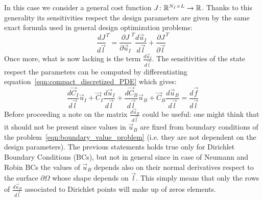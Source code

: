 In this case we consider a general cost function $J \colon \mathbb{R}^{N_I \times L} \to \mathbb{R}$. Thanks to this generality its sensitivities respect the design parameters are given by the same exact formula used in general design optimization problems:
\begin{equation}
	\label{eqn:gradient_1st_step_1D_RBF-FD}
	\frac{dJ}{d\vec{l}}^T = \frac{\partial J}{\partial \vec{u}_I}^T \frac{d\vec{u}_I}{d\vec{l}} + \frac{\partial J}{\partial \vec{l}}^T
\end{equation}
Once more, what is now lacking is the term $\frac{d\vec{u}_I}{d\vec{l}}$. The sensitivities of the state respect the parameters can be computed by differentiating equation~\eqref{eqn:compact_discretized_PDE} which gives:
\begin{equation}
	\frac{d\vec{C}_I}{d\vec{l}} \vec{u}_I + \vec{C}_I \frac{d\vec{u}_I}{d\vec{l}} + \frac{d\vec{C}_B}{d\vec{l}} \vec{u}_B + \vec{C}_B \frac{d\vec{u}_B}{d\vec{l}} =
	\frac{d\vec{f}}{d\vec{l}}
\end{equation} 
Before proceeding a note on the matrix $\frac{d\vec{u}_B}{d\vec{l}}$ could be useful: one might think that it should not be present since values in $\vec{u}_B$ are fixed from boundary conditions of the problem~\eqref{eqn:boundary_value_problem} (i.e. they are not dependent on the design parameters). The previous statements holds true only for Dirichlet Boundary Conditions (BCs), but not in general since in case of Neumann and Robin BCs the values of $\vec{u}_B$ depends also on their normal derivatives respect to the surface $\partial\Omega$ whose shape depends on $\vec{l}$. This simply means that only the rows of $\frac{d\vec{u}_B}{d\vec{l}}$ associated to Dirichlet points will make up of zeros elements.


